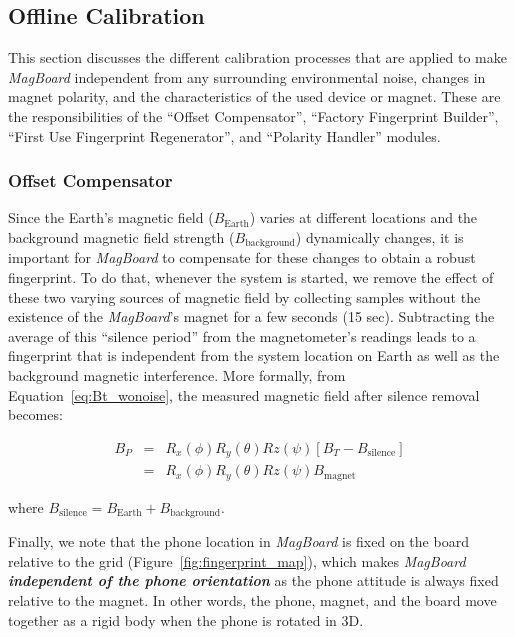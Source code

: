 \documentclass[conference]{IEEEtran}
\def \sys {\textit{MagBoard}}
\begin{document}
\subsection{Offline Calibration}

This section discusses the different calibration processes that are applied to make \sys{} independent from any surrounding environmental noise, changes in magnet polarity, and the characteristics of the used device or magnet. These are the responsibilities of the ``Offset Compensator'', ``Factory Fingerprint Builder'', ``First Use Fingerprint Regenerator'', and ``Polarity Handler'' modules.

\subsubsection{Offset Compensator}
\label{sec:offset_comp}

Since the Earth's magnetic field  ($B_{\textrm{Earth}}$) varies at different locations and the background magnetic field strength ($B_{\textrm{background}}$) dynamically changes, it is important for \sys{} to compensate for these changes to obtain a robust fingerprint. To do that, whenever the system is started, we remove the effect of these two varying sources of magnetic field by collecting samples without the existence of the \sys{}'s magnet for a few seconds (15 sec). Subtracting the average of this ``silence period'' from the magnetometer's readings leads to a fingerprint that is independent from the system location on Earth as well as the background magnetic interference. 
More formally, from Equation~\ref{eq:Bt_wonoise}, the measured magnetic field after silence removal becomes:

\begin{eqnarray}
B_P &=& R_x(\phi)R_y(\theta)Rz(\psi) [B_T- B_{\textrm{silence}}] \nonumber \\
    &=& R_x(\phi)R_y(\theta)Rz(\psi) B_{\textrm{magnet}}
\label{eq:Bt_offset}
\end{eqnarray}

where $B_{\textrm{silence}}= B_{\textrm{Earth}}+ B_{\textrm{background}}$.

Finally, we note that the phone location in \sys{} is fixed on the board relative to the grid (Figure~\ref{fig:fingerprint_map}), which 
makes \sys{} \textbf{\emph{independent of the phone orientation}} as the phone attitude is always fixed relative to the magnet. In other words, the phone, magnet, and the board move together as a rigid body when the phone is rotated in 3D.
\end{document}
